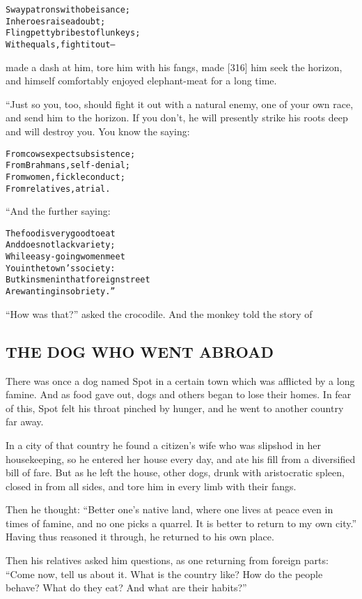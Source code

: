\documentclass{article}
\renewenvironment{verbatim}{\begin{alltt}\normalfont\begin{centering}}{\end{centering}\end{alltt}}
\begin{document}
\begin{verbatim}
Sway patrons with obeisance;
    In heroes raise a doubt;
Fling petty bribes to flunkeys;
    With equals, fight it out--
\end{verbatim}
made a dash at him, tore him with his fangs, made [316] him seek
the horizon, and himself comfortably enjoyed elephant-meat for a
long time.

“Just so you, too, should fight it out with a natural enemy, one of
your own race, and send him to the horizon. If you don't, he will
presently strike his roots deep and will destroy you. You know the
saying:

\begin{verbatim}
From cows expect subsistence;
    From Brahmans, self-denial;
From women, fickle conduct;
    From relatives, a trial.
\end{verbatim}
“And the further saying:

\begin{verbatim}
The food is very good to eat
    And does not lack variety;
While easy-going women meet
    You in the town's society:
But kinsmen in that foreign street
    Are wanting in sobriety.”
\end{verbatim}
``How was that?'' asked the crocodile. And the monkey told the
story of

\subsection{THE DOG WHO WENT ABROAD}

There was once a dog named Spot in a certain town which was
afflicted by a long famine. And as food gave out, dogs and others
began to lose their homes. In fear of this, Spot felt his throat
pinched by hunger, and he went to another country far away.

In a city of that country he found a citizen's wife who was
slipshod in her housekeeping, so he entered her house every day,
and ate his fill from a diversified bill of fare. But as he left
the house, other dogs, drunk with aristocratic spleen, closed in
from all sides, and tore him in every limb with their fangs.

Then he thought:
``Better one's native land, where one lives at peace even in times of famine, and no one picks a quarrel. It is better to return to my own city.''
Having thus reasoned it through, he returned to his own place.

Then his relatives asked him questions, as one returning from
foreign parts:
``Come now, tell us about it. What is the country like? How do the people behave? What do they eat? And what are their habits?''
\end{document}
